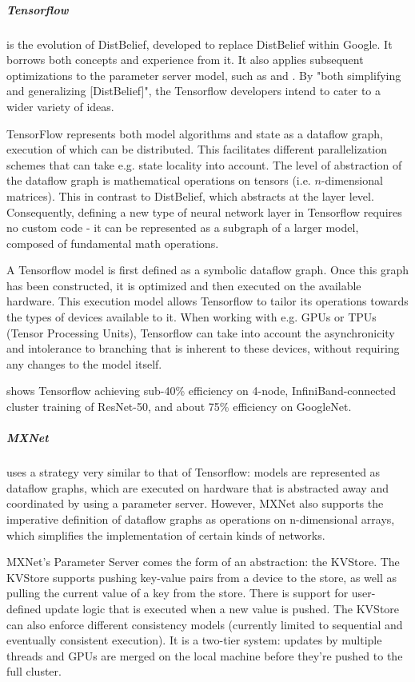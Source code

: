 \subparagraph{Tensorflow \citep{Tensorflow2015}\citep{Tensorflow2016}}
is the evolution of DistBelief, developed to replace DistBelief within Google. It borrows both concepts and experience from it. It also applies subsequent optimizations to the parameter server model, such as \citet{Chilimbi14} and \citet{Li2014Comms}\citep{Li2014Scaling}. By "both simplifying and generalizing [DistBelief]"\citep{Tensorflow2016}, the Tensorflow developers intend to cater to a wider variety of ideas.

TensorFlow represents both model algorithms and state as a dataflow graph, execution of which can be distributed. This facilitates different parallelization schemes that can take e.g. state locality into account. The level of abstraction of the dataflow graph is mathematical operations on tensors (i.e. $n$-dimensional matrices). This in contrast to DistBelief, which abstracts at the layer level. Consequently, defining a new type of neural network layer in Tensorflow requires no custom code - it can be represented as a subgraph of a larger model, composed of fundamental math operations.

A Tensorflow model is first defined as a symbolic dataflow graph. Once this graph has been constructed, it is optimized and then executed on the available hardware. This execution model allows Tensorflow to tailor its operations towards the types of devices available to it. When working with e.g. GPUs or TPUs (Tensor Processing Units\citep{TPU2017}), Tensorflow can take into account the asynchronicity and intolerance to branching that is inherent to these devices, without requiring any changes to the model itself.

\citet{Shaohuai2017} shows Tensorflow achieving sub-40\% efficiency on 4-node, InfiniBand-connected cluster training of ResNet-50\citet{He2015}, and about 75\% efficiency on GoogleNet\citep{Szegedy2014}. 


\subparagraph{MXNet \citep{MXNet2015}}
uses a strategy very similar to that of Tensorflow: models are represented as dataflow graphs, which are executed on hardware that is abstracted away and coordinated by using a parameter server. However, MXNet also supports the imperative definition of dataflow graphs as operations on n-dimensional arrays, which simplifies the implementation of certain kinds of networks.

MXNet's Parameter Server comes the form of an abstraction: the KVStore. The KVStore supports pushing key-value pairs from a device to the store, as well as pulling the current value of a key from the store. There is support for user-defined update logic that is executed when a new value is pushed. The KVStore can also enforce different consistency models (currently limited to sequential and eventually consistent execution). It is a two-tier system: updates by multiple threads and GPUs are merged on the local machine before they're pushed to the full cluster.


